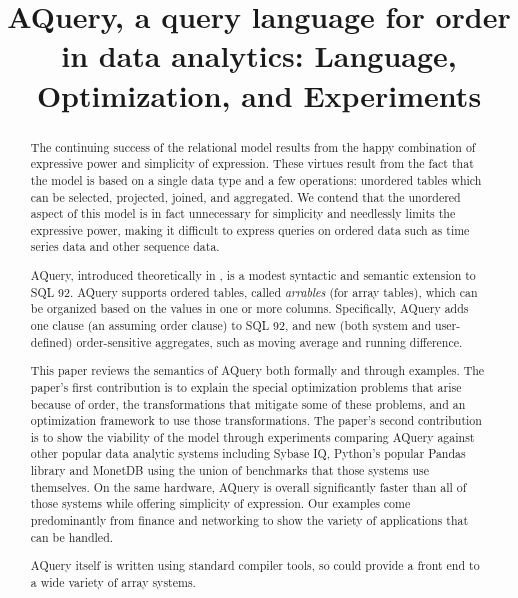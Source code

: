 \documentclass{acm_proc_article-sp}
\begin{document}
%





\title{
AQuery, a query language for order in data 
analytics: Language, Optimization, and Experiments
}

					
\maketitle

\begin{abstract}

The continuing success of the relational model results from 
the happy combination of 
expressive power and simplicity of expression.
These virtues result from the fact that the
model is based on a single data type 
and a few operations: unordered tables
which can be selected, projected, joined, and aggregated. 
We contend that the unordered aspect of this model is in fact unnecessary
for simplicity and needlessly limits the expressive power,
making it difficult to express queries on ordered data such as time
series data and other sequence data.

AQuery, introduced theoretically in \cite{lernershashaaquery}, 
is a modest syntactic and semantic extension
to SQL 92. AQuery supports ordered tables, called {\em arrables} (for
array tables), which can be organized based 
on the values in one or more columns.
Specifically,
AQuery adds one clause (an assuming order clause) to SQL 92, and
new (both system and user-defined)
order-sensitive aggregates, such as moving average and running difference.

This paper reviews 
the semantics of AQuery both formally and through
examples. The paper's first contribution
is to explain the special optimization problems that
arise because of order, the transformations that mitigate some of these
problems, and an optimization framework to use those transformations.
The paper's second contribution is to show the viability
of the model through
experiments comparing AQuery against other popular
data analytic systems including Sybase IQ,
Python's popular Pandas library and MonetDB using the union
of benchmarks that those systems use themselves.
On the same hardware, AQuery is overall significantly faster than
all of those systems while offering simplicity of expression.
Our examples come predominantly from finance and 
networking to show the variety of applications that can be
handled.

AQuery itself is written using standard compiler tools, so could
provide a front end to a wide variety of array systems.


\end{abstract}
\end{document}
